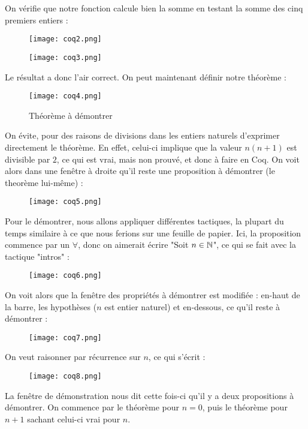 On vérifie que notre fonction calcule bien la somme en testant la somme des cinq premiers entiers : 
\begin{figure}[!ht]
\centering
\texttt{[image: coq2.png]}
\end{figure}
\begin{figure}[!ht]
\centering
\texttt{[image: coq3.png]}
\end{figure}

Le résultat a donc l'air correct. On peut maintenant définir notre théorème : 

\begin{figure}[!ht]
\centering
\texttt{[image: coq4.png]}
\caption{Théorème à démontrer}
\end{figure}
\newpage
On évite, pour des raisons de divisions dans les entiers naturels d'exprimer directement le théorème. En effet, celui-ci implique que la valeur $n(n+1)$ est divisible par $2$, ce qui est vrai, mais non prouvé, et donc à faire en Coq. On voit alors dans une fenêtre à droite qu'il reste une proposition à démontrer (le theorème lui-même) : 

\begin{figure}[!ht]
\centering
\texttt{[image: coq5.png]}
\end{figure}

 Pour le démontrer, nous allons appliquer différentes tactiques, la plupart du temps similaire à ce que nous ferions sur une feuille de papier. Ici, la proposition commence par un $\forall$, donc on aimerait écrire "Soit $n\in \mathbb{N}$", ce qui se fait avec la tactique "intros" : 
\begin{figure}[!ht]
\centering
\texttt{[image: coq6.png]}
\end{figure}

On voit alors que la fenêtre des propriétés à démontrer est modifiée : en-haut de la barre, les hypothèses ($n$ est entier naturel) et en-dessous, ce qu'il reste à démontrer :

\begin{figure}[!ht]
\centering
\texttt{[image: coq7.png]}
\end{figure}

On veut raisonner par récurrence sur $n$, ce qui s'écrit : 

\begin{figure}[!ht]
\centering
\texttt{[image: coq8.png]}
\end{figure}

La fenêtre de démonstration nous dit cette fois-ci qu'il y a deux propositions à démontrer. On commence par le théorème pour $n=0$, puis le théorème pour $n+1$ sachant celui-ci vrai pour $n$.
 
